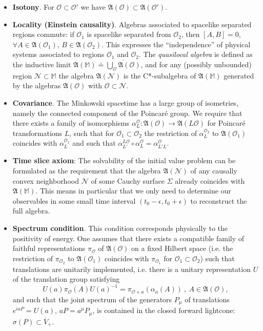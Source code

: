 \documentclass[12pt]{article}
\newcommand{\fA}{\mathfrak{A}}
\newcommand{\Ncal}{\mathcal{N}}
\newcommand{\Ocal}{\mathcal{O}}
\newcommand{\M}{\mathbb{M}} 	     %
\newcommand{\1}{\mathds{1}}                         %
\begin{document}
\begin{itemize}
	\item {\bf Isotony}. For $\Ocal\subset \Ocal'$ we have $\fA(\Ocal)\subset \fA(\Ocal')$.
	\item {\bf Locality (Einstein causality)}. Algebras associated to spacelike separated regions commute: if
$\Ocal_1$ is spacelike separated from $\Ocal_2$, then $[A, B] = 0$, $\forall A \in \fA(\Ocal_1)$, $B \in \fA(\Ocal_2)$. This expresses the ``independence'' of physical systems associated to regions  $\Ocal_1$ and $\Ocal_2$. The \textit{quasilocal algebra} is defined as the inductive limit $\fA(\M)\doteq\overline{\bigcup\limits_\Ocal\fA(\Ocal)}$, and for any (possibly unbounded) region $\Ncal\subset\M$ the algebra $\fA(\Ncal)$ is the C*-subalgebra of $\fA(\M)$ generated by the algebras $\fA(\Ocal)$ with $\Ocal\subset \Ncal$.
	\item {\bf Covariance}. The Minkowski spacetime has a large group of isometries, namely the connected component of the Poincar\'e group. We require that  there exists a family of isomorphisms $\alpha_L^\Ocal : \fA(\Ocal) \rightarrow\fA(L \Ocal)$ for Poincar\'e transformations $L$, such that for
$\Ocal_1 \subset \Ocal_2$ the restriction of $\alpha_L^{\Ocal_2}$ to $\fA(\Ocal_1)$ coincides with $\alpha_L^{\Ocal_1}$ and such that $\alpha^{L\Ocal}_{L'}\circ \alpha^{\Ocal}_{L}=\alpha^{\Ocal}_{L'L}$.
	\item {\bf Time slice axiom}: The solvability of the initial value problem can be formulated as the requirement that the algebra $\mathfrak{A}(\Ncal)$ of any causally convex neighborhood $\Ncal$ of some Cauchy surface $\Sigma$ already coincides with $\mathfrak{A}(\M)$. This means in particular that we only need to determine our observables in some small time interval $(t_0-\epsilon,t_0+\epsilon)$ to reconstruct the full algebra.
	\item {\bf Spectrum condition}. This condition corresponds physically to the positivity of energy. One assumes that there exists a compatible family of faithful representations $\pi_{\Ocal}$ of 
	$\fA(\Ocal)$ on a fixed Hilbert space (i.e. the restriction of $\pi_{\Ocal_2}$ to $\fA(\Ocal_1)$ coincides with $\pi_{\Ocal_1}$ for $\Ocal_1\subset\Ocal_2$) such that translations are unitarily implemented, i.e. there is a unitary representation $U$ of the translation group satisfying
	\[U(a)\pi_{\Ocal}(A)U(a)^{-1}=\pi_{\Ocal+a}(\alpha_a(A))\ ,\ A\in\fA(\Ocal),\]
	and such that the joint spectrum of the generators $P_{\mu}$ of translations $e^{iaP}=U(a)$, $aP=a^\mu P_\mu$, is contained in the closed forward lightcone: $\sigma(P)\subset \overline{V}_+$. %
	\end{itemize}
\end{document}
